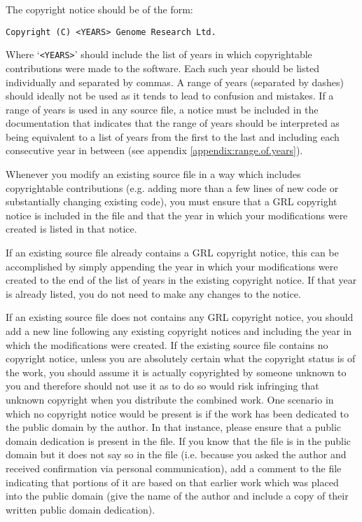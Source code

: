 \documentclass[10pt,a4paper]{article}
\begin{document}
\par The copyright notice should be of the form: 
\begin{verbatim}
Copyright (C) <YEARS> Genome Research Ltd.
\end{verbatim}

\par Where `\texttt{<YEARS>}' should include the list of years in which copyrightable 
contributions \cite{define:copyrightable} were made to the software. Each such year 
should be listed individually and separated by commas. A range of years (separated 
by dashes) should ideally not be used as it tends to lead to confusion and mistakes. 
If a range of years is used in any source file, a notice must be included in the 
documentation that indicates that the range of years should be interpreted as being 
equivalent to a list of years from the first to the last and including each consecutive 
year in between (see appendix \ref{appendix:range.of.years}). 

\par Whenever you modify an existing source file in a way which includes copyrightable 
contributions (e.g. adding more than a few lines of new code or substantially changing 
existing code), you must ensure that a GRL copyright notice is 
included in the file and that the year in which your modifications were created is 
listed in that notice. 

\par If an existing source file already contains a GRL copyright notice, this can be 
accomplished by simply appending the year in which your modifications were created 
to the end of the list of years in the existing copyright notice. If that year is already 
listed, you do not need to make any changes to the notice. 

\par If an existing source file does not contains any GRL copyright 
notice, you should add a new line following any existing copyright notices and 
including the year in which the modifications were created. If the existing source 
file contains no copyright notice, unless you are absolutely certain what the 
copyright status is of the work, you should assume it is actually copyrighted by 
someone unknown to you and therefore should not use it as to do so would risk 
infringing that unknown copyright when you distribute the combined work. One 
scenario in which no copyright notice would be present is if the work has been 
dedicated to the public domain by the author. In that instance, please ensure 
that a public domain dedication is present in the file. If you know 
that the file is in the public domain but it does not say so in the file (i.e. because 
you asked the author and received confirmation via personal communication), 
add a comment to the file indicating that portions of it are based on that earlier 
work which was placed into the public domain (give the name of the author and 
include a copy of their written public domain dedication). 
\end{document}
